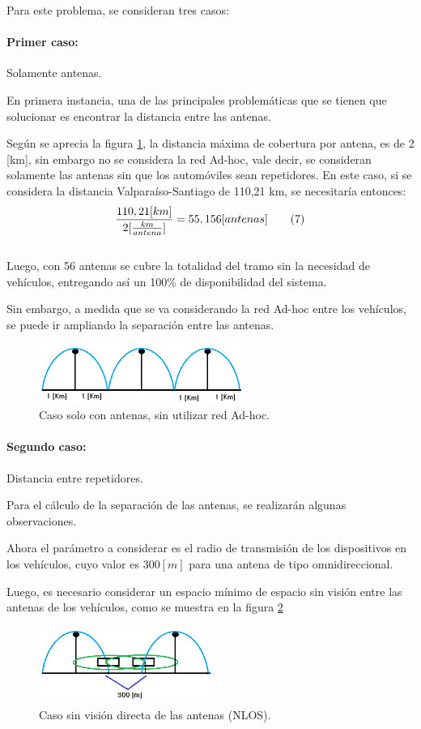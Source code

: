 \documentclass[12pt]{article}
\begin{document}
Para este problema, se consideran tres casos:
\paragraph{Primer caso:} Solamente antenas.

En primera instancia, una de las principales problemáticas que se tienen que solucionar es encontrar la 
distancia entre las antenas. 

Según se aprecia la figura \ref{fig:s-adhoc}, la distancia máxima de cobertura por antena, es de 2 [km], sin embargo no 
se considera la red Ad-hoc, vale decir, se consideran solamente las antenas sin que los automóviles sean 
repetidores. En este caso, si se considera la distancia Valparaíso-Santiago de 110,21 km, se necesitaría 
entonces:
\large $$ \frac{110,21 [km]}{2 [\frac{km}{antena}]}= 55,156 [antenas] \qquad \tiny(7)$$ \normalsize \\

Luego, con 56 antenas se cubre la totalidad del tramo sin la necesidad de vehículos, entregando así un 
100\% de disponibilidad del sistema.

Sin embargo, a medida que se va considerando la red Ad-hoc entre los vehículos, se puede ir  ampliando 
la separación entre las antenas.  

\begin{figure}[H]
  \centering
      \includegraphics[width=0.6\textwidth]{s-adhoc}
	    \caption{Caso solo con antenas, sin utilizar red Ad-hoc.}
	\label{fig:s-adhoc}
\end{figure}
\paragraph{Segundo caso:} Distancia entre repetidores.

Para el cálculo de la separación de las antenas, se realizarán algunas observaciones.

Ahora el parámetro a considerar es el radio de transmisión de los dispositivos en los vehículos, cuyo 
valor es $300[m]$ para una antena de tipo omnidireccional.

Luego, es necesario considerar un espacio mínimo de espacio sin visión entre las antenas de los vehículos, 
como se muestra en la figura \ref{fig:adhoc1}
\begin{figure}[H]
  \centering
      \includegraphics[width=0.5\textwidth]{adhoc1}
	    \caption{Caso sin visión directa de las antenas (NLOS).}
	\label{fig:adhoc1}
\end{figure}
\end{document}
